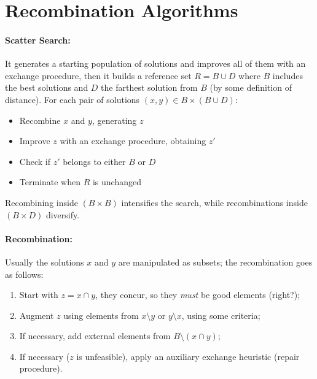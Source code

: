 \documentclass{article}
\begin{document}
	\section*{Recombination Algorithms}
	
	\paragraph{Scatter Search:} It generates a starting population of solutions and improves all of them with an exchange procedure, then it builds a reference set $R = B \cup D$ where $B$ includes the best solutions and $D$ the farthest solution from $B$ (by some definition of distance). For each pair of solutions $(x,y) \in B \times (B \cup D)$: 
	\begin{itemize}
		\item Recombine $x$ and $y$, generating $z$
		\item Improve $z$ with an exchange procedure, obtaining $z'$
		\item Check if $z'$ belongs to either $B$ or $D$
		\item Terminate when $R$ is unchanged
	\end{itemize}
	Recombining inside $(B \times B)$ intensifies the search, while recombinations inside $(B \times D)$ diversify.\\
	
	\paragraph{Recombination:} Usually the solutions $x$ and $y$ are manipulated as subsets; the recombination goes as follows: 
	\begin{enumerate}
		\item Start with $z = x \cap y$, they concur, so they \textit{must} be good elements (right?);
		\item Augment $z$ using elements from $x\setminus y$ or $y \setminus x$, using some criteria;
		\item If necessary, add external elements from $B \setminus (x \cap y)$;
		\item If necessary ($z$ is unfeasible), apply an auxiliary exchange heuristic (repair procedure).\\
	\end{enumerate}
	
\end{document}
